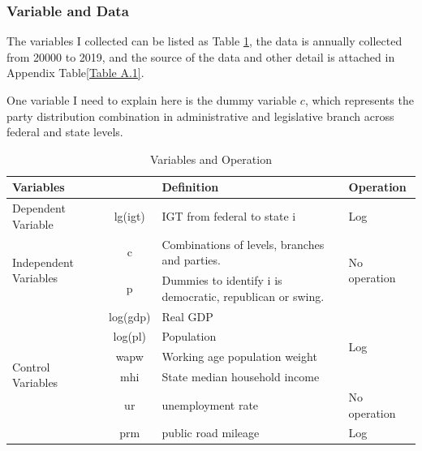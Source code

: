 \subsubsection{Variable and Data}
The variables I collected can be listed as Table \ref*{Table 2.5}, the data is annually collected from 20000 to 2019, and the source of the data and other detail is attached in Appendix Table\ref*{Table A.1}.

One variable I need to explain here is the dummy variable $c$, which represents the party distribution combination in administrative and legislative branch across federal and state levels.


\begin{table}[htbp]
  \centering
  \caption{Variables and Operation}
  \begin{tabular}{lcp{12.715em}p{6.145em}}
    \toprule
    \multicolumn{2}{p{9.93em}}{Variables }                        & Definition & Operation                                                                                    \\
    \midrule
    \multicolumn{1}{p{4.715em}}{Dependent Variable}               & lg(igt)    & IGT from federal to state i                               & Log                              \\
    \midrule
    \multicolumn{1}{l}{\multirow{2}[4]{*}{Independent Variables}} & c          & Combinations of levels, branches and parties.             & \multirow{2}[4]{*}{No operation} \\
    \cmidrule{2-3}                                                & p          & Dummies to identify i is democratic, republican or swing. & \multicolumn{1}{c}{}             \\
    \midrule
    \multicolumn{1}{l}{\multirow{6}[12]{*}{Control Variables}}    & log(gdp)   & \multicolumn{1}{l}{Real GDP}                              & \multirow{4}[8]{*}{Log }         \\
    \cmidrule{2-3}                                                & log(pl)    & \multicolumn{1}{l}{Population }                           & \multicolumn{1}{c}{}             \\
    \cmidrule{2-3}                                                & wapw       & Working age population weight                             & \multicolumn{1}{c}{}             \\
    \cmidrule{2-3}                                                & mhi        & State median household income                             & \multicolumn{1}{c}{}             \\
    \cmidrule{2-4}                                                & ur         & unemployment rate                                         & No operation                     \\
    \cmidrule{2-4}                                                & prm        & public road mileage                                       & Log                              \\
    \bottomrule
  \end{tabular}%
  \label{Table 2.5}%
\end{table}%

